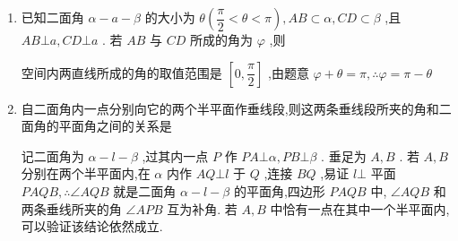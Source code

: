 \begin{enumerate}
    \item 已知二面角 $\alpha  - a - \beta$ 的大小为 $\theta \left( {\dfrac{\pi }{2} < \theta  < \pi }\right) ,{AB} \subset  \alpha ,{CD} \subset  \beta$ ,且 ${AB} \bot  a,{CD} \bot  a$ . 若 ${AB}$ 与 ${CD}$ 所成的角为 $\varphi$ ,则 
    \begin{jieda}
        空间内两直线所成的角的取值范围是 $\left\lbrack  {0,\dfrac{\pi }{2}}\right\rbrack$ ,由题意 $\varphi  + \theta  = \pi ,\therefore \varphi  = \pi  - \theta$ 
    \end{jieda}
    
    \item 自二面角内一点分别向它的两个半平面作垂线段,则这两条垂线段所夹的角和二面角的平面角之间的关系是
    \begin{jieda}
        记二面角为 $\alpha  - l - \beta$ ,过其内一点 $P$ 作 ${PA}\bot \alpha ,{PB}\bot \beta$ . 垂足为 $A,B$ . 若 $A,B$ 分别在两个半平面内,在 $\alpha$ 内作 ${AQ}\bot l$ 于 $Q$ ,连接 ${BQ}$ ,易证 $l\bot$ 平面 ${PAQB},\therefore \angle {AQB}$ 就是二面角 $\alpha  - l - \beta$ 的平面角,四边形 ${PAQB}$ 中, $\angle {AQB}$ 和两条垂线所夹的角 $\angle {APB}$ 互为补角. 若 $A,B$ 中恰有一点在其中一个半平面内,可以验证该结论依然成立.
    \end{jieda}
    

\end{enumerate}
